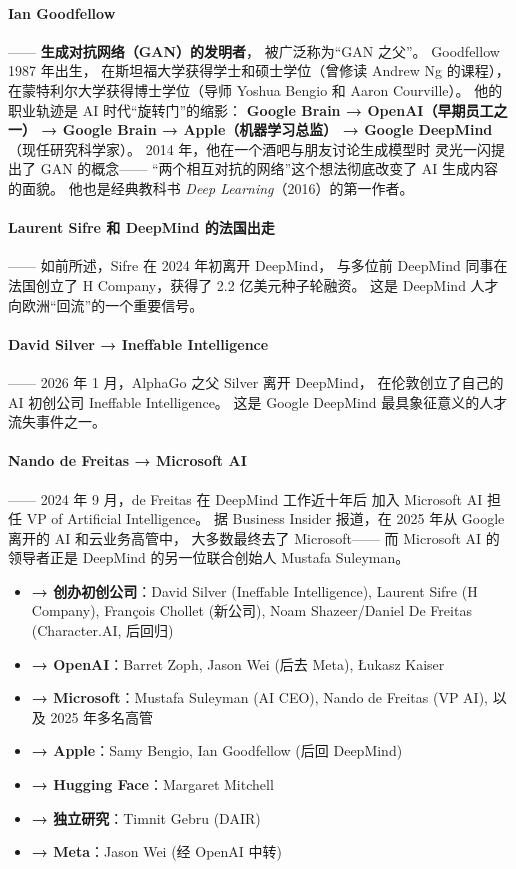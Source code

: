 \paragraph{Ian Goodfellow}——
\textbf{生成对抗网络（GAN）的发明者}，
被广泛称为``GAN 之父''。
Goodfellow 1987 年出生，
在斯坦福大学获得学士和硕士学位（曾修读 Andrew Ng 的课程），
在蒙特利尔大学获得博士学位（导师 Yoshua Bengio 和 Aaron Courville）。
他的职业轨迹是 AI 时代``旋转门''的缩影：
\textbf{Google Brain → OpenAI（早期员工之一） → Google Brain →
Apple（机器学习总监） → Google DeepMind}（现任研究科学家）。
2014 年，他在一个酒吧与朋友讨论生成模型时
灵光一闪提出了 GAN 的概念——
``两个相互对抗的网络''这个想法彻底改变了 AI 生成内容的面貌。
他也是经典教科书 \textit{Deep Learning}（2016）的第一作者。

\paragraph{Laurent Sifre 和 DeepMind 的法国出走}——
如前所述，Sifre 在 2024 年初离开 DeepMind，
与多位前 DeepMind 同事在法国创立了 H Company，获得了 2.2 亿美元种子轮融资。
这是 DeepMind 人才向欧洲``回流''的一个重要信号。

\paragraph{David Silver → Ineffable Intelligence}——
2026 年 1 月，AlphaGo 之父 Silver 离开 DeepMind，
在伦敦创立了自己的 AI 初创公司 Ineffable Intelligence。
这是 Google DeepMind 最具象征意义的人才流失事件之一。

\paragraph{Nando de Freitas → Microsoft AI}——
2024 年 9 月，de Freitas 在 DeepMind 工作近十年后
加入 Microsoft AI 担任 VP of Artificial Intelligence。
据 Business Insider 报道，在 2025 年从 Google 离开的 AI 和云业务高管中，
大多数最终去了 Microsoft——
而 Microsoft AI 的领导者正是 DeepMind 的另一位联合创始人 Mustafa Suleyman。

\begin{corebox}
\begin{itemize}[noitemsep]
  \item \textbf{→ 创办初创公司}：David Silver (Ineffable Intelligence),
        Laurent Sifre (H Company), François Chollet (新公司),
        Noam Shazeer/Daniel De Freitas (Character.AI, 后回归)
  \item \textbf{→ OpenAI}：Barret Zoph, Jason Wei (后去 Meta), Łukasz Kaiser
  \item \textbf{→ Microsoft}：Mustafa Suleyman (AI CEO), Nando de Freitas (VP AI),
        以及 2025 年多名高管
  \item \textbf{→ Apple}：Samy Bengio, Ian Goodfellow (后回 DeepMind)
  \item \textbf{→ Hugging Face}：Margaret Mitchell
  \item \textbf{→ 独立研究}：Timnit Gebru (DAIR)
  \item \textbf{→ Meta}：Jason Wei (经 OpenAI 中转)
\end{itemize}
\end{corebox}



